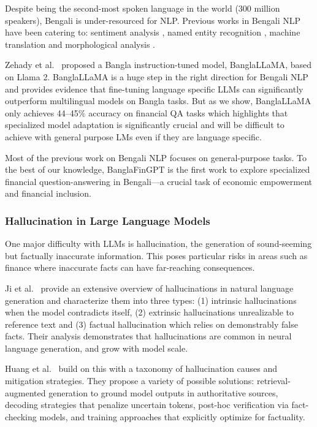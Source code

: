 \documentclass{article}
\begin{document}
Despite being the second-most spoken language in the world (300 million speakers),
Bengali is under-resourced for NLP. Previous works in Bengali NLP have been catering
to: sentiment analysis \cite{islam2022}, named entity recognition \cite{rifat2019},
machine translation \cite{Paul2023} and morphological analysis \cite{ali2008}.

Zehady et al.~\cite{zehady2025} proposed a Bangla instruction-tuned model, BanglaLLaMA,
based on Llama 2. BanglaLLaMA is a huge step in the right direction for Bengali NLP and
provides evidence that fine-tuning language specific LLMs can significantly outperform
multilingual models on Bangla tasks. But as we show, BanglaLLaMA only achieves 44--45\%
accuracy on financial QA tasks which highlights that specialized model adaptation is
significantly crucial and will be difficult to achieve with general purpose LMs even if
they are language specific.

Most of the previous work on Bengali NLP focuses on general-purpose tasks. To the best
of our knowledge, BanglaFinGPT is the first work to explore specialized financial
question-answering in Bengali---a crucial task of economic empowerment and financial
inclusion.

\subsubsection{Hallucination in Large Language Models}

One major difficulty with LLMs is hallucination, the generation of sound-seeming but
factually inaccurate information. This poses particular risks in areas such as finance
where inaccurate facts can have far-reaching consequences.

Ji et al.~\cite{Ji2023} provide an extensive overview of hallucinations in natural
language generation and characterize them into three types: (1) intrinsic
hallucinations when the model contradicts itself, (2) extrinsic hallucinations
unrealizable to reference text and (3) factual hallucination which relies on
demonstrably false facts. Their analysis demonstrates that hallucinations are common in
neural language generation, and grow with model scale.

Huang et al.~\cite{huang2024} build on this with a taxonomy of hallucination causes and
mitigation strategies. They propose a variety of possible solutions:
retrieval-augmented generation to ground model outputs in authoritative sources,
decoding strategies that penalize uncertain tokens, post-hoc verification via
fact-checking models, and training approaches that explicitly optimize for factuality.
\end{document}
